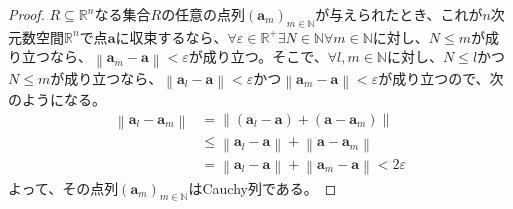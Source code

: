 \documentclass[dvipdfmx]{jsarticle}
\begin{document}
\begin{proof}
$R \subseteq \mathbb{R}^{n}$なる集合$R$の任意の点列$\left( \mathbf{a}_{m} \right)_{m \in \mathbb{N}}$が与えられたとき、これが$n$次元数空間$\mathbb{R}^{n}$で点$\mathbf{a}$に収束するなら、$\forall\varepsilon \in \mathbb{R}^{+}\exists N \in \mathbb{N}\forall m \in \mathbb{N}$に対し、$N \leq m$が成り立つなら、$\left\| \mathbf{a}_{m} - \mathbf{a} \right\| < \varepsilon$が成り立つ。そこで、$\forall l,m \in \mathbb{N}$に対し、$N \leq l$かつ$N \leq m$が成り立つなら、$\left\| \mathbf{a}_{l} - \mathbf{a} \right\| < \varepsilon$かつ$\left\| \mathbf{a}_{m} - \mathbf{a} \right\| < \varepsilon$が成り立つので、次のようになる。
\begin{align*}
\left\| \mathbf{a}_{l} - \mathbf{a}_{m} \right\| &= \left\| \left( \mathbf{a}_{l} - \mathbf{a} \right) + \left( \mathbf{a} - \mathbf{a}_{m} \right) \right\|\\
&\leq \left\| \mathbf{a}_{l} - \mathbf{a} \right\| + \left\| \mathbf{a} - \mathbf{a}_{m} \right\|\\
&= \left\| \mathbf{a}_{l} - \mathbf{a} \right\| + \left\| \mathbf{a}_{m} - \mathbf{a} \right\| < 2\varepsilon
\end{align*}
よって、その点列$\left( \mathbf{a}_{m} \right)_{m \in \mathbb{N}}$はCauchy列である。
\end{proof}
\end{document}
